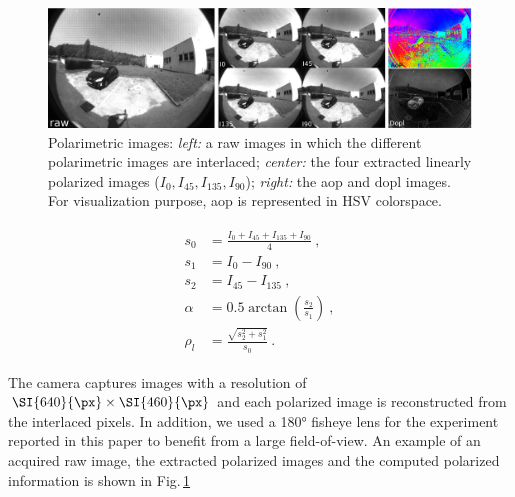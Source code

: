 \begin{figure}
  \centering
  \includegraphics[width=1.0\textwidth]{./content/intro/figures/image_pola.jpeg}
  \caption{Polarimetric images: \emph{left:} a raw images in which the
    different polarimetric images are interlaced; \emph{center:} the four
    extracted linearly polarized images ($I_0, I_{45}, I_{135}, I_{90}$);
    \emph{right:} the \gls{aop} and \gls{dopl} images. For visualization purpose,
    \gls{aop} is represented in HSV colorspace.}
  \label{fig:raw-sp}
\end{figure}





\begin{gather}
  \begin{aligned}
    s_0 & = \frac{I_0 + I_{45} + I_{135} + I_{90}}{4} \ ,\\
    s_1 & = I_0 - I_{90} \ , \\
    s_2 & = I_{45} - I_{135} \ , \\
    \alpha &= 0.5 \arctan(\frac{s_2}{s_1}) \ , \\
    \rho_l &= \frac{\sqrt{s_2^{2} + s_1^{2}}}{s_0} \ .
    \label{eq:stokes}
  \end{aligned}
\end{gather}

The camera captures images with a resolution of $\SI{640}{\px} \times
\SI{460}{\px}$ and each polarized image is reconstructed from the interlaced
pixels. In addition, we used a \ang{180} fisheye lens for the experiment
reported in this paper to benefit from a large field-of-view. An example of an
acquired raw image, the extracted polarized images and the computed polarized
information is shown in Fig.\,\ref{fig:raw-sp}

